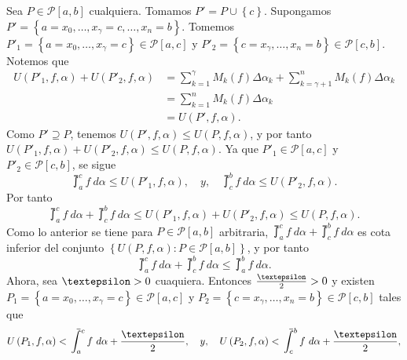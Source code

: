 Sea $P\in\mathcal{P}\left[a,b\right]$ cualquiera. Tomamos $P'=P\cup\left\lbrace c\right\rbrace$. Supongamos $P'=\left\lbrace a=x_0,\dots,x_\gamma=c,\dots,x_n=b\right\rbrace$. Tomemos $P'_1=\left\lbrace a=x_0,\dots,x_\gamma=c\right\rbrace\in\mathcal{P}\left[a,c\right]$ y $P'_2=\left\lbrace c=x_\gamma,\dots,x_n=b\right\rbrace\in\mathcal{P}\left[c,b\right]$. Notemos que
  \begin{align*}
  U\left(P'_1,f,\alpha\right)+U\left(P'_2,f,\alpha\right)&=\sum_{k=1}^{\gamma}M_k\left(f\right)\Delta\alpha_k+\sum_{k=\gamma+1}^{n}M_k\left(f\right)\Delta\alpha_k\\
  &=\sum_{k=1}^{n}M_k\left(f\right)\Delta\alpha_k\\
  &=U\left(P',f,\alpha\right).
  \end{align*}
  Como $P'\supseteq P$, tenemos $U\left(P',f,\alpha\right)\leq U\left(P,f,\alpha\right)$, y por tanto $U\left(P'_1,f,\alpha\right)+U\left(P'_2,f,\alpha\right)\leq U\left(P,f,\alpha\right)$. Ya que $P'_1\in\mathcal{P}\left[a,c\right]$ y $P'_2\in\mathcal{P}\left[c,b\right]$, se sigue
  \begin{equation*}
    \upint_a^c f\ d\alpha \leq U\left(P'_1,f,\alpha\right),\quad y,\quad \upint_c^b f\ d\alpha \leq U\left(P'_2,f,\alpha\right).
  \end{equation*}
  Por tanto
  \begin{equation*}
    \upint_a^c f\ d\alpha + \upint_c^b f\ d\alpha \leq U\left(P'_1,f,\alpha\right)+U\left(P'_2,f,\alpha\right)\leq U\left(P,f,\alpha\right).
  \end{equation*}
  Como lo anterior se tiene para $P\in\mathcal{P}\left[a,b\right]$ arbitraria, $\upint_a^c f\ d\alpha + \upint_c^b f\ d\alpha$ es cota inferior del conjunto $\left\lbrace U\left(P,f,\alpha\right):P\in\mathcal{P}\left[a,b\right]\right\rbrace$, y por tanto
  \setcounter{equation}{0}
  \begin{equation}
    \upint_a^c f\ d\alpha + \upint_c^b f\ d\alpha \leq \upint_a^b f\ d\alpha.
  \end{equation}
  Ahora, sea $\text{\textepsilon}>0$ cuaquiera. Entonces $\frac{\text{\textepsilon}}{2}>0$ y existen $P_1=\left\lbrace a=x_0,\dots,x_\gamma=c\right\rbrace\in\mathcal{P}\left[a,c\right]$ y $P_2=\left\lbrace c=x_\gamma,\dots,x_n=b\right\rbrace\in\mathcal{P}\left[c,b\right]$ tales que
  \begin{equation*}
    U\left(P_1,f,\alpha\right)<\upint_a^c f\ d\alpha+\frac{\text{\textepsilon}}{2},\quad y,\quad U\left(P_2,f,\alpha\right)<\upint_c^b f\ d\alpha+\frac{\text{\textepsilon}}{2},
  \end{equation*}
